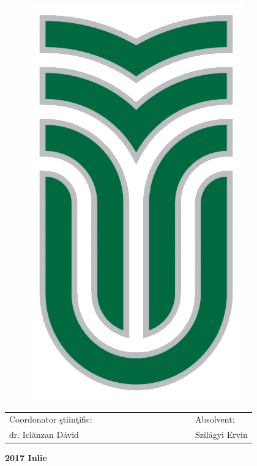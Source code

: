 \documentclass[12pt, a4paper, oneside]{book}
\theoremstyle{tetel}
\begin{document}
\vspace{2cm}
\begin{figure}[htb]
	\begin{center}
		\includegraphics{sapientia_logo.png}
	\end{center}
\end{figure}

\vspace{2cm}
\begin{center}
\begin{tabular}{lcccccccccccl}
    Coordonator \c{s}tiin\c{t}ific:&&&&&&& &&&&&Absolvent:\\
     dr. Iclănzan Dávid&&&&&& &&&&&&Szilágyi Ervin\\

\end{tabular}
\end{center}

\begin{center}
    \vspace{1cm}\textbf{2017 Iulie}
\end{center}
\end{document}
